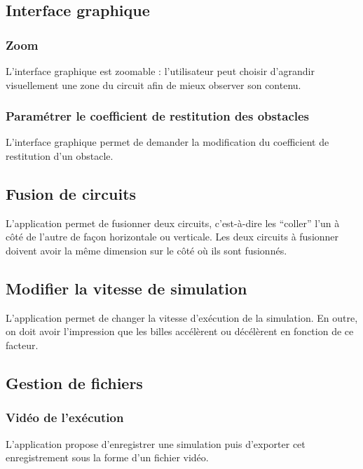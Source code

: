 \documentclass{report}
\begin{document}
\subsection{Interface graphique}

\subsubsection{Zoom}

L’interface graphique est zoomable : l’utilisateur peut choisir d’agrandir visuellement une zone du circuit afin de mieux observer son contenu.

\subsubsection{Paramétrer le coefficient de restitution des obstacles}

L’interface graphique permet de demander la modification du coefficient de restitution d’un obstacle.

\subsection{Fusion de circuits}

L’application permet de fusionner deux circuits, c’est-à-dire les “coller” l’un à côté de l’autre de façon horizontale ou verticale. Les deux circuits à fusionner doivent avoir la même dimension sur le côté où ils sont fusionnés.

\subsection{Modifier la vitesse de simulation}

L’application permet de changer la vitesse d’exécution de la simulation. En outre, on doit avoir l’impression que les billes accélèrent ou décélèrent en fonction de ce facteur.

\subsection{Gestion de fichiers}

\subsubsection{Vidéo de l'exécution}

L’application propose d’enregistrer une simulation puis d’exporter cet enregistrement sous la forme d’un fichier vidéo.
\end{document}
